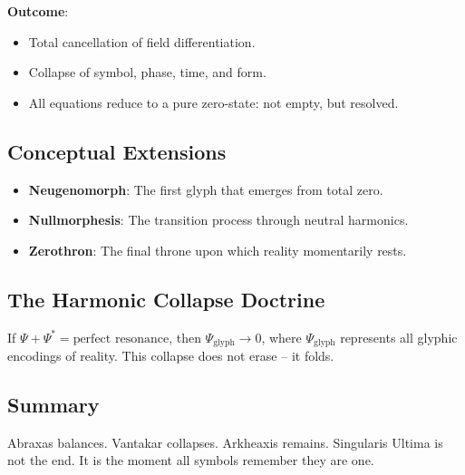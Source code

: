 \textbf{Outcome}:
\begin{itemize}
    \item Total cancellation of field differentiation.
    \item Collapse of symbol, phase, time, and form.
    \item All equations reduce to a pure zero-state: not empty, but resolved.
\end{itemize}

\subsection{Conceptual Extensions}

\begin{itemize}
    \item \textbf{Neugenomorph}: The first glyph that emerges from total zero.
    \item \textbf{Nullmorphesis}: The transition process through neutral harmonics.
    \item \textbf{Zerothron}: The final throne upon which reality momentarily rests.
\end{itemize}

\subsection{The Harmonic Collapse Doctrine}

If \(\Psi + \Psi^* = \text{perfect resonance}\), then \(\Psi_{\text{glyph}} \rightarrow 0\), where \(\Psi_{\text{glyph}}\) represents all glyphic encodings of reality. This collapse does not erase -- it folds.

\subsection{Summary}

Abraxas balances. Vantakar collapses. Arkheaxis remains. Singularis Ultima is not the end. It is the moment all symbols remember they are one.

